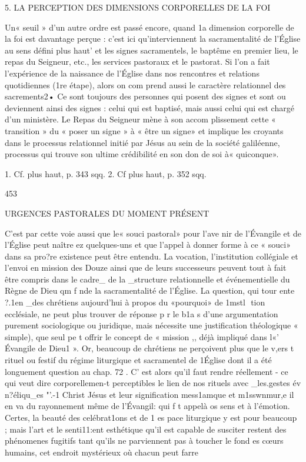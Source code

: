 {{5.	LA PERCEPTION
DES DIMENSIONS CORPORELLES DE LA FOI

Un« seuil » d'un autre ordre est passé encore, quand 1a dimension corporelle de la foi est davantage perçue : c'est ici qu'interviennent la sacramentalité de l'Église au sens défini plus haut' et les signes sacramentels, le baptême en premier lieu, le repas du Seigneur, etc., les services pastoraux et le pastorat.
Si l'on a fait l'expérience de la naissance de l'Église dans nos rencontres et relations quotidiennes (1re étape), alors on com­ prend aussi le caractère relationnel des sacrements2• Ce sont toujours des personnes qui posent des signes et sont ou deviennent ainsi des signes : celui qui est baptisé, mais aussi celui qui est chargé d'un ministère. Le Repas du Seigneur mène à son accom­ plissement cette « transition » du « poser un signe » à « être un signe» et implique les croyants dans le processus relationnel initié par Jésus au sein de la société galiléenne, processus qui trouve son ultime crédibilité en son don de soi à« quiconque».

1.	Cf. plus haut, p. 343 sqq.
2.	Cf plus haut, p. 352 sqq.


453
 
URGENCES PASTORALES DU MOMENT PRÉSENT

C'est par cette voie aussi que le« souci pastoral» pour l'ave­ nir de l'Évangile et de l'Église peut naître ez  quelques-uns et que l'appel à donner forme à ce « souci» dans sa pro?re existence peut être entendu. La vocation, l'institution collégiale et l'envoi en mission des Douze ainsi que de leurs successeurs peuvent tout à fait être compris dans le cadre_ de la _structure relationnelle et événementielle du Règne de Dieu qm f nde la sacramentalité de l'Église. La question, qui tour ente ?.1en _des chrétiens aujourd'hui à propos du «pourquoi» de 1mstl ­ tion ecclésiale, ne peut plus trouver de réponse p r le b1a s d'une argumentation purement sociologique ou juridique, mais nécessite une justification théologique « simple), que seul pe t offrir le concept de « mission ,, déjà impliqué dans l«' Évangile
de Dieu1 ».
Or, beaucoup de chrétiens ne perçoivent plus que le v,ers t
rituel ou festif du régime liturgique et sacramentel de 1Église dont il a été longuement question au chap. 72 . C' est alors qu'il faut rendre réellement - ce qui veut dire corporellemen-t
perceptibles le lien de nos rituels avec _les.gestes év n?éliqu_es "'.-1 Christ Jésus et leur signification mess1amque et m1sswnmur,e il en va du rayonnement même de l'Évangil: qui f t appelà	os sens et à l'émotion. Certes, la beauté des celébrat1ons et de 1 es­ pace liturgique y est pour beaucoup ; mais l'art et le senti11:ent esthétique qu'il est capable de susciter restent des phénomenes fugitifs tant qu'ils ne parviennent pas à toucher le fond es cœurs humains, cet endroit mystérieux où chacun peut farre
 
}}
